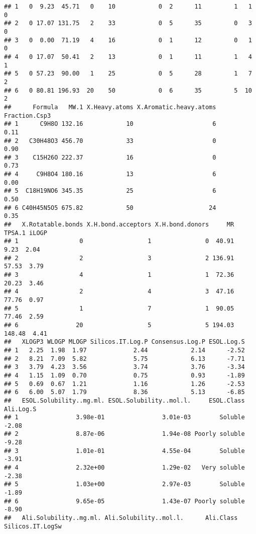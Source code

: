 \documentclass[
]{article}
\begin{document}
\begin{verbatim}
## 1   0  9.23  45.71   0    10            0  2      11         1   1       0
## 2   0 17.07 131.75   2    33            0  5      35         0   3       0
## 3   0  0.00  71.19   4    16            0  1      12         0   1       0
## 4   0 17.07  50.41   2    13            0  1      11         1   4       1
## 5   0 57.23  90.00   1    25            0  5      28         1   7       2
## 6   0 80.81 196.93  20    50            0  6      35         5  10       2
##      Formula   MW.1 X.Heavy.atoms X.Aromatic.heavy.atoms Fraction.Csp3
## 1      C9H8O 132.16            10                      6          0.11
## 2   C30H48O3 456.70            33                      0          0.90
## 3    C15H26O 222.37            16                      0          0.73
## 4     C9H8O4 180.16            13                      6          0.00
## 5  C18H19NO6 345.35            25                      6          0.50
## 6 C40H45N5O5 675.82            50                     24          0.35
##   X.Rotatable.bonds X.H.bond.acceptors X.H.bond.donors     MR TPSA.1 iLOGP
## 1                 0                  1               0  40.91   9.23  2.04
## 2                 2                  3               2 136.91  57.53  3.79
## 3                 4                  1               1  72.36  20.23  3.46
## 4                 2                  4               3  47.16  77.76  0.97
## 5                 1                  7               1  90.05  77.46  2.59
## 6                20                  5               5 194.03 148.48  4.41
##   XLOGP3 WLOGP MLOGP Silicos.IT.Log.P Consensus.Log.P ESOL.Log.S
## 1   2.25  1.98  1.97             2.44            2.14      -2.52
## 2   8.21  7.09  5.82             5.75            6.13      -7.71
## 3   3.79  4.23  3.56             3.74            3.76      -3.34
## 4   1.15  1.09  0.70             0.75            0.93      -1.89
## 5   0.69  0.67  1.21             1.16            1.26      -2.53
## 6   6.00  5.07  1.79             8.36            5.13      -6.85
##   ESOL.Solubility..mg.ml. ESOL.Solubility..mol.l.     ESOL.Class Ali.Log.S
## 1                3.98e-01                3.01e-03        Soluble     -2.08
## 2                8.87e-06                1.94e-08 Poorly soluble     -9.28
## 3                1.01e-01                4.55e-04        Soluble     -3.91
## 4                2.32e+00                1.29e-02   Very soluble     -2.38
## 5                1.03e+00                2.97e-03        Soluble     -1.89
## 6                9.65e-05                1.43e-07 Poorly soluble     -8.90
##   Ali.Solubility..mg.ml. Ali.Solubility..mol.l.      Ali.Class Silicos.IT.LogSw

\end{verbatim}
\end{document}
